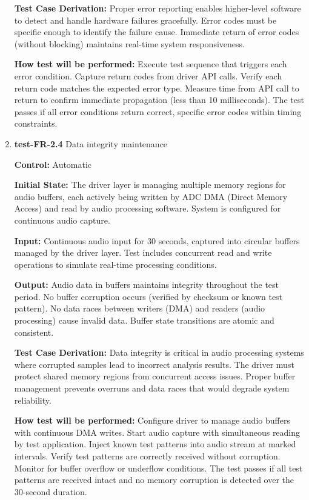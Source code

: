 \documentclass[12pt, titlepage]{article}
\begin{document}
\begin{enumerate}
\textbf{Test Case Derivation:} 
Proper error reporting enables higher-level software to detect and handle 
hardware failures gracefully. Error codes must be specific enough to identify 
the failure cause. Immediate return of error codes (without blocking) maintains 
real-time system responsiveness.
					
\textbf{How test will be performed:}
Execute test sequence that triggers each error condition. Capture return codes 
from driver API calls. Verify each return code matches the expected error type. 
Measure time from API call to return to confirm immediate propagation (less than 
10 milliseconds). The test passes if all error conditions return correct, specific 
error codes within timing constraints.

\item{\textbf{test-FR-2.4} Data integrity maintenance\\}

\textbf{Control:} Automatic
					
\textbf{Initial State:} 
The driver layer is managing multiple memory regions for audio buffers, each 
actively being written by ADC DMA (Direct Memory Access) and read by audio 
processing software. System is configured for continuous audio capture.
					
\textbf{Input:}
Continuous audio input for 30 seconds, captured into circular buffers managed 
by the driver layer. Test includes concurrent read and write operations to 
simulate real-time processing conditions.
					
\textbf{Output:}
Audio data in buffers maintains integrity throughout the test period. No buffer 
corruption occurs (verified by checksum or known test pattern). No data races 
between writers (DMA) and readers (audio processing) cause invalid data. Buffer 
state transitions are atomic and consistent.

\textbf{Test Case Derivation:} 
Data integrity is critical in audio processing systems where corrupted samples 
lead to incorrect analysis results. The driver must protect shared memory regions 
from concurrent access issues. Proper buffer management prevents overruns and 
data races that would degrade system reliability.
					
\textbf{How test will be performed:}
Configure driver to manage audio buffers with continuous DMA writes. Start audio 
capture with simultaneous reading by test application. Inject known test patterns 
into audio stream at marked intervals. Verify test patterns are correctly received 
without corruption. Monitor for buffer overflow or underflow conditions. The test 
passes if all test patterns are received intact and no memory corruption is detected 
over the 30-second duration.

\end{enumerate}
\end{document}
